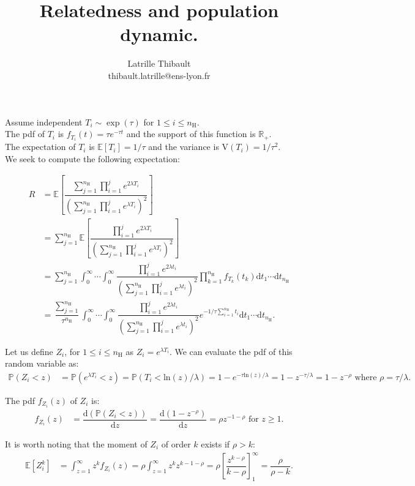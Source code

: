 \documentclass{article}
\author{Latrille Thibault\\
\small thibault.latrille@ens-lyon.fr\\[-0.8ex]}
\title{Relatedness and population dynamic.}
\newcommand{\ud}{{\mathrm{d}}}
\newcommand{\nN}{{n_\textrm{H}}}
\begin{document}
Assume independent $T_i \sim \exp ( \tau)$ for $1 \leq i \leq \nN$. \\ 

The pdf of $T_i$ is $f_{T_i}(t)=\tau e^{-\tau t }$ and the support of this function is $\mathbb{R}_+$. \\

The expectation of $T_i$ is $\mathbb{E}[T_i ]= 1/\tau$ and the variance is $\mathrm{V}(T_i)=1/ \tau^2$.\\

We seek to compute the following expectation: 

\begin{align}
R &= \mathbb{E} \left[ \dfrac{ \sum_{j=1}^\nN \prod_{i=1}^j e^{2 \lambda T_i } }{ \left( \sum_{j=1}^\nN \prod_{i=1}^j e^{\lambda T_i } \right)^2 } \right] \\
  &=  \sum_{j=1}^\nN \mathbb{E} \left[ \dfrac{  \prod_{i=1}^j e^{2 \lambda T_i } }{ \left( \sum_{j=1}^\nN \prod_{i=1}^j e^{\lambda T_i } \right)^2 } \right] \\
  &= \displaystyle \sum_{j=1}^\nN \int_0^\infty \cdots \int_0^\infty  \dfrac{   \prod_{i=1}^j e^{2 \lambda t_i } }{ \left( \sum_{j=1}^\nN \prod_{i=1}^j e^{\lambda t_i } \right)^2 } \prod_{k=1}^\nN f_{T_k}(t_k)  \ud t_1 \cdots \ud t_\nN \\
   &= \dfrac{\sum_{j=1}^\nN}{ \tau^\nN }\displaystyle \int_0^\infty \cdots \int_0^\infty  \dfrac{  \prod_{i=1}^j e^{2 \lambda t_i } }{ \left( \sum_{j=1}^\nN \prod_{i=1}^j e^{\lambda t_i } \right)^2 } e^{- 1/ \tau \sum_{i=1}^\nN t_i}  \ud t_1 \cdots \ud t_\nN.
\end{align}

Let us define $Z_i$, for $1 \leq i \leq \nN$ as $Z_i=e^{\lambda T_i}$. We can evaluate the pdf of this random variable as:
\begin{align}
\mathbb{P}(Z_i<z) &= \mathbb{P}(e^{\lambda T_i}<z) = \mathbb{P}(T_i< \mathrm{ln}(z)/\lambda ) = 1 - e^{ - \tau \mathrm{ln}(z) / \lambda } = 1 - z^{ - \tau / \lambda }= 1 - z^{ - \rho } \text{ where } \rho=\tau / \lambda.
\end{align}

The pdf $f_{Z_i}(z)$ of $Z_i$ is:
\begin{align}
f_{Z_i}(z) &= \dfrac{ \ud \left( \mathbb{P}(Z_i<z) \right)  }{ \ud z}= \dfrac{ \ud \left( 1 - z^{ - \rho } \right) }{ \ud z} = \rho z^{ -1 - \rho } \text{ for } z \geq 1.
\end{align}

It is worth noting that the moment of $Z_i$ of order $k$ exists if $\rho>k $:
\begin{align}
\mathbb{E}[Z_i^k] &= \int_{z=1}^\infty z^k f_{Z_i}(z) =\rho \int_{z=1}^\infty z^k  z^{k -1 - \rho } =\rho \left[ \dfrac{z^{k - \rho }}{k - \rho}\right]_1^\infty = \dfrac{\rho}{\rho -k }.
\end{align}
\end{document}
